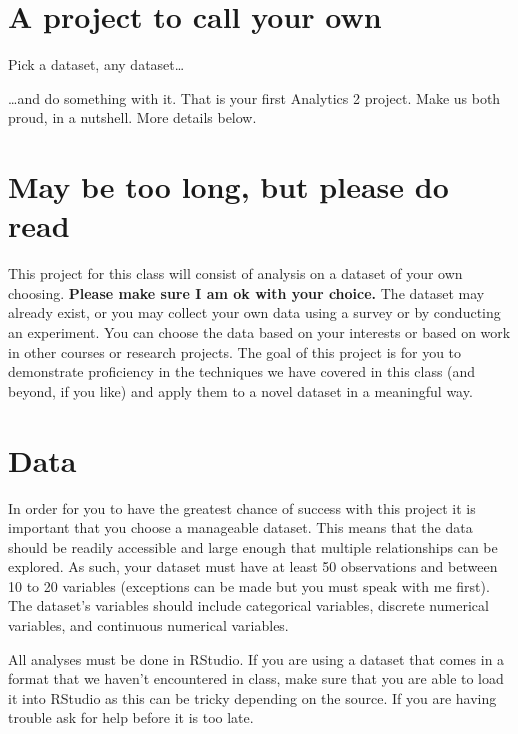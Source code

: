 \documentclass[
]{book}
\begin{document}
\hypertarget{a-project-to-call-your-own}{%
\section{A project to call your own}\label{a-project-to-call-your-own}}

Pick a dataset, any dataset\ldots{}

\ldots and do something with it. That is your first Analytics 2 project. Make us both proud, in a nutshell. More details below.

\hypertarget{may-be-too-long-but-please-do-read}{%
\section{May be too long, but please do read}\label{may-be-too-long-but-please-do-read}}

This project for this class will consist of analysis on a dataset of your own
choosing. \textbf{Please make sure I am ok with your choice.} The dataset may already exist,
or you may collect your own data using a
survey or by conducting an experiment. You can choose the data based on your interests
or based on work in other courses or research projects. The goal of this project is for
you to demonstrate proficiency in the techniques we have covered in this class (and
beyond, if you like) and apply them to a novel dataset in a meaningful way.

\hypertarget{data-1}{%
\section{Data}\label{data-1}}

In order for you to have the greatest chance of success with this project it is important that
you choose a manageable dataset. This means that the data should be readily accessible and large
enough that multiple relationships can be explored. As such, your dataset must have at least 50
observations and between 10 to 20 variables (exceptions can be made but you must speak with me
first). The dataset's variables should include categorical variables, discrete numerical
variables, and continuous numerical variables.

All analyses must be done in RStudio. If you are using a dataset that comes in a format that
we haven't encountered in class, make sure that you are able to load it into RStudio as this
can be tricky depending on the source. If you are having trouble ask for help before it is too late.
\end{document}
